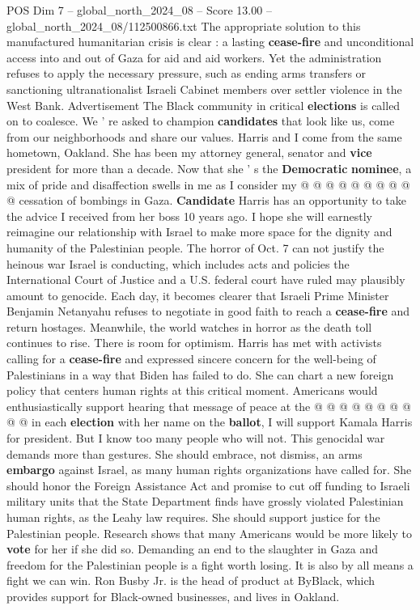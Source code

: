 \begin{textsample}{POS Dim 7 – global\_north\_2024\_08 – Score 13.00 – global\_north\_2024\_08/112500866.txt}
The appropriate solution to this manufactured humanitarian crisis is clear : a lasting \textbf{cease-fire} and unconditional access into and out of Gaza for aid and aid workers.
Yet the administration refuses to apply the necessary pressure, such as ending arms transfers or sanctioning ultranationalist Israeli Cabinet members over settler violence in the West Bank.
Advertisement The Black community in critical \textbf{elections} is called on to coalesce.
We ' re asked to champion \textbf{candidates} that look like us, come from our neighborhoods and share our values.
Harris and I come from the same hometown, Oakland.
She has been my attorney general, senator and \textbf{vice} president for more than a decade.
Now that she ' s the \textbf{Democratic} \textbf{nominee}, a mix of pride and disaffection swells in me as I consider my @ @ @ @ @ @ @ @ @ @ cessation of bombings in Gaza. \textbf{Candidate} Harris has an opportunity to take the advice I received from her boss 10 years ago.
I hope she will earnestly reimagine our relationship with Israel to make more space for the dignity and humanity of the Palestinian people.
The horror of Oct. 7 can not justify the heinous war Israel is conducting, which includes acts and policies the International Court of Justice and a U.S. federal court have ruled may plausibly amount to genocide.
Each day, it becomes clearer that Israeli Prime Minister Benjamin Netanyahu refuses to negotiate in good faith to reach a \textbf{cease-fire} and return hostages.
Meanwhile, the world watches in horror as the death toll continues to rise.
There is room for optimism.
Harris has met with activists calling for a \textbf{cease-fire} and expressed sincere concern for the well-being of Palestinians in a way that Biden has failed to do.
She can chart a new foreign policy that centers human rights at this critical moment.
Americans would enthusiastically support hearing that message of peace at the @ @ @ @ @ @ @ @ @ @ in each \textbf{election} with her name on the \textbf{ballot}, I will support Kamala Harris for president.
But I know too many people who will not.
This genocidal war demands more than gestures.
She should embrace, not dismiss, an arms \textbf{embargo} against Israel, as many human rights organizations have called for.
She should honor the Foreign Assistance Act and promise to cut off funding to Israeli military units that the State Department finds have grossly violated Palestinian human rights, as the Leahy law requires.
She should support justice for the Palestinian people.
Research shows that many Americans would be more likely to \textbf{vote} for her if she did so.
Demanding an end to the slaughter in Gaza and freedom for the Palestinian people is a fight worth losing.
It is also by all means a fight we can win.
Ron Busby Jr. is the head of product at ByBlack, which provides support for Black-owned businesses, and lives in Oakland.

\end{textsample}
